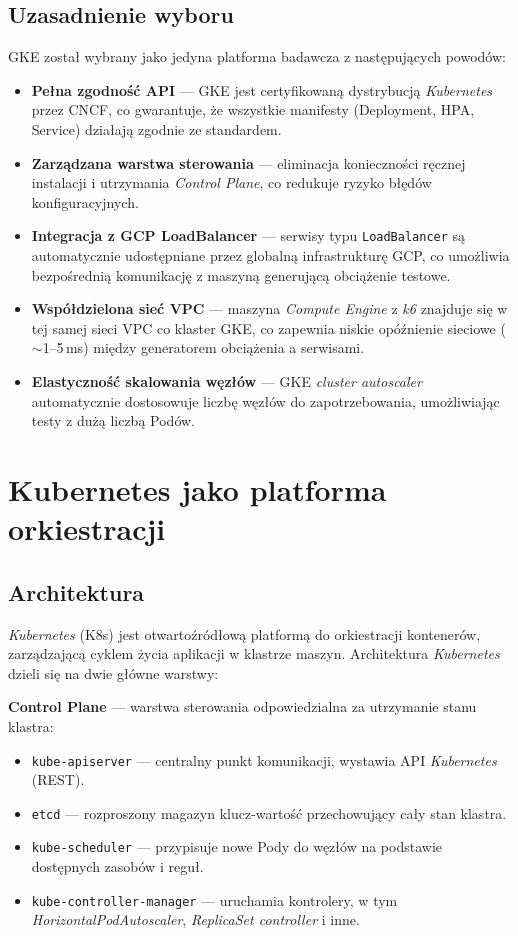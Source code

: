\subsection{Uzasadnienie wyboru}

GKE został wybrany jako jedyna platforma badawcza z następujących powodów:

\begin{itemize}
  \item \textbf{Pełna zgodność API} — GKE jest certyfikowaną dystrybucją \textit{Kubernetes} przez CNCF, co gwarantuje, że wszystkie manifesty (Deployment, HPA, Service) działają zgodnie ze standardem.
  \item \textbf{Zarządzana warstwa sterowania} — eliminacja konieczności ręcznej instalacji i utrzymania \textit{Control Plane}, co redukuje ryzyko błędów konfiguracyjnych.
  \item \textbf{Integracja z GCP LoadBalancer} — serwisy typu \texttt{LoadBalancer} są automatycznie udostępniane przez globalną infrastrukturę GCP, co umożliwia bezpośrednią komunikację z maszyną generującą obciążenie testowe.
  \item \textbf{Współdzielona sieć VPC} — maszyna \textit{Compute Engine} z \textit{k6} znajduje się w tej samej sieci VPC co klaster GKE, co zapewnia niskie opóźnienie sieciowe ($\sim$1--5\,ms) między generatorem obciążenia a serwisami.
  \item \textbf{Elastyczność skalowania węzłów} — GKE \textit{cluster autoscaler} automatycznie dostosowuje liczbę węzłów do zapotrzebowania, umożliwiając testy z dużą liczbą Podów.
\end{itemize}

\section{Kubernetes jako platforma orkiestracji}

\subsection{Architektura}

\textit{Kubernetes} (K8s) jest otwartoźródłową platformą do orkiestracji kontenerów, zarządzającą cyklem życia aplikacji w klastrze maszyn. Architektura \textit{Kubernetes} dzieli się na dwie główne warstwy:

\textbf{Control Plane} — warstwa sterowania odpowiedzialna za utrzymanie stanu klastra:
\begin{itemize}
  \item \texttt{kube-apiserver} — centralny punkt komunikacji, wystawia API \textit{Kubernetes} (REST).
  \item \texttt{etcd} — rozproszony magazyn klucz-wartość przechowujący cały stan klastra.
  \item \texttt{kube-scheduler} — przypisuje nowe Pody do węzłów na podstawie dostępnych zasobów i reguł.
  \item \texttt{kube-controller-manager} — uruchamia kontrolery, w tym \textit{HorizontalPodAutoscaler}, \textit{ReplicaSet controller} i inne.
\end{itemize}

